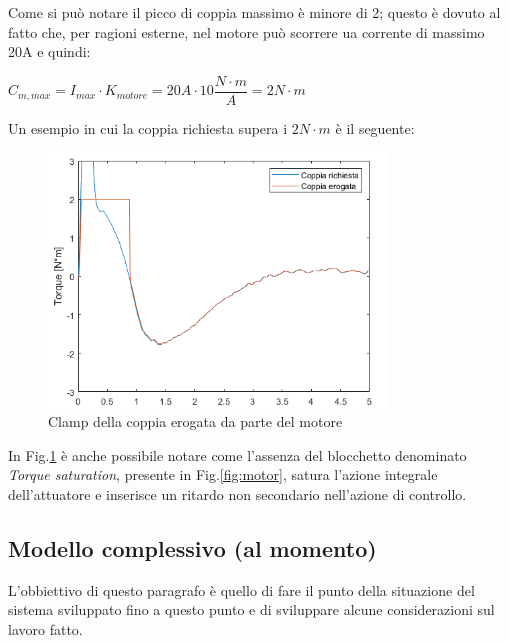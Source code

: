 Come si può notare il picco di coppia massimo è minore di 2; questo è dovuto al fatto che, per ragioni esterne, nel motore può scorrere ua corrente di massimo 20A e quindi:
\begin{center}
	$C_{m,max} = I_{max}\cdot{K_{motore}} = 20 A\cdot{10 \dfrac{N\cdot{m}}{A}}=2N\cdot{m}$
\end{center}

Un esempio in cui la coppia richiesta supera i $2N\cdot{m}$ è il seguente:
\begin{figure}[H]
	\centering   	
	\includegraphics[width=0.8\textwidth]{Immagini/saturazione.png}
	\caption{Clamp della coppia erogata da parte del motore}
	\label{fig:clamp_motore}
\end{figure}
In Fig.\ref{fig:clamp_motore} è anche possibile notare come l'assenza del blocchetto denominato \textit{Torque saturation}, presente in Fig.\ref{fig:motor}, satura l'azione integrale dell'attuatore e inserisce un ritardo non secondario nell'azione di controllo.
\subsection{Modello complessivo (al momento)}
L'obbiettivo di questo paragrafo è quello di fare il punto della situazione del sistema sviluppato fino a questo punto e di sviluppare alcune considerazioni sul lavoro fatto.

